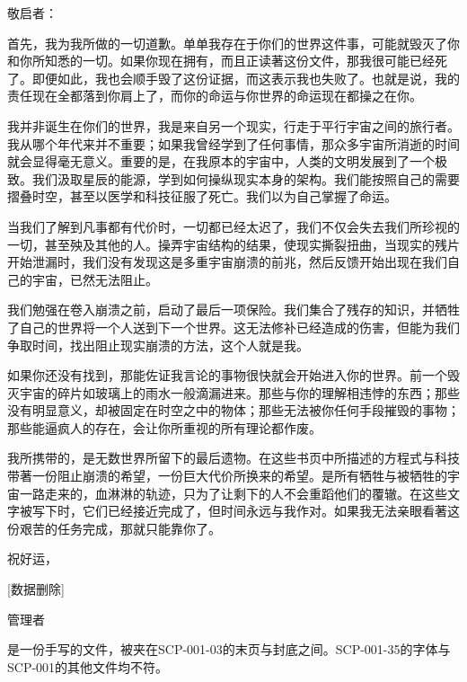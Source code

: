 \begin{scpbox}

敬启者：

首先，我为我所做的一切道歉。单单我存在于你们的世界这件事，可能就毁灭了你和你所知悉的一切。如果你现在拥有，而且正读著这份文件，那我很可能已经死了。即便如此，我也会顺手毁了这份证据，而这表示我也失败了。也就是说，我的责任现在全都落到你肩上了，而你的命运与你世界的命运现在都操之在你。

我并非诞生在你们的世界，我是来自另一个现实，行走于平行宇宙之间的旅行者。我从哪个年代来并不重要；如果我曾经学到了任何事情，那众多宇宙所消逝的时间就会显得毫无意义。重要的是，在我原本的宇宙中，人类的文明发展到了一个极致。我们汲取星辰的能源，学到如何操纵现实本身的架构。我们能按照自己的需要摺叠时空，甚至以医学和科技征服了死亡。我们以为自己掌握了命运。

当我们了解到凡事都有代价时，一切都已经太迟了，我们不仅会失去我们所珍视的一切，甚至殃及其他的人。操弄宇宙结构的结果，使现实撕裂扭曲，当现实的残片开始泄漏时，我们没有发现这是多重宇宙崩溃的前兆，然后反馈开始出现在我们自己的宇宙，已然无法阻止。

我们勉强在卷入崩溃之前，启动了最后一项保险。我们集合了残存的知识，并牺牲了自己的世界将一个人送到下一个世界。这无法修补已经造成的伤害，但能为我们争取时间，找出阻止现实崩溃的方法，这个人就是我。

如果你还没有找到，那能佐证我言论的事物很快就会开始进入你的世界。前一个毁灭宇宙的碎片如玻璃上的雨水一般滴漏进来。那些与你的理解相违悖的东西；那些没有明显意义，却被固定在时空之中的物体；那些无法被你任何手段摧毁的事物；那些能逼疯人的存在，会让你所重视的所有理论都作废。

我所携带的，是无数世界所留下的最后遗物。在这些书页中所描述的方程式与科技带著一份阻止崩溃的希望，一份巨大代价所换来的希望。是所有牺牲与被牺牲的宇宙一路走来的，血淋淋的轨迹，只为了让剩下的人不会重蹈他们的覆辙。在这些文字被写下时，它们已经接近完成了，但时间永远与我作对。如果我无法亲眼看著这份艰苦的任务完成，那就只能靠你了。

祝好运，

[数据删除]

管理者

\end{scpbox}

是一份手写的文件，被夹在SCP-001-03的末页与封底之间。SCP-001-35的字体与SCP-001的其他文件均不符。

